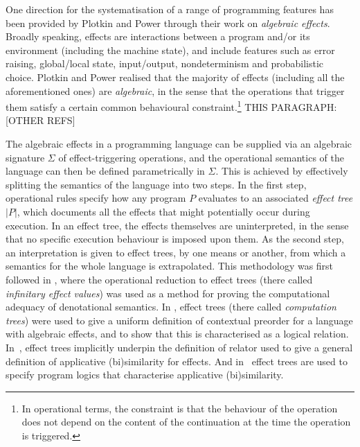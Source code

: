 One direction for the systematisation of a range of programming features has been provided by Plotkin and Power through their work on
 \emph{algebraic effects}. Broadly speaking, effects are interactions between a  program and/or its environment (including the machine state), and include features such as
 error raising, global/local state, input/output, nondeterminism and probabilistic choice. 
 Plotkin and Power realised that the majority of effects (including all the aforementioned ones) are \emph{algebraic}, in the sense that the operations that trigger them %
 satisfy a certain common behavioural constraint.\footnote{In operational terms, the constraint  is that the behaviour of the operation does not depend on the content of the continuation at the time the operation is triggered.} THIS PARAGRAPH: \cite{plotkin2001adequacy} [OTHER REFS]

The algebraic effects  in a programming language can  be supplied via an algebraic signature $\Sigma$ of effect-triggering operations,
and the operational semantics of the language can then be defined parametrically in $\Sigma$. 
This is achieved by effectively splitting the semantics of 
the language into two steps. In the first step, operational rules specify how any program $P$ evaluates 
to an associated \emph{effect tree} $|P|$, 
which documents  all the effects that might potentially occur during execution. %
In an effect tree, the effects themselves are uninterpreted, in the sense that no specific execution behaviour is imposed upon them. 
As the second step, an interpretation is given to effect trees, by one means or another, from which a semantics for the whole language is extrapolated.
This methodology was first followed in \cite{plotkin2001adequacy}, where the operational reduction to effect trees (there called \emph{infinitary effect values}) was used as a method for proving the computational adequacy of denotational semantics. 
In \cite{gom}, effect trees (there called \emph{computation trees}) were used to give a uniform definition of 
contextual preorder for a language with algebraic effects, and to show that this is characterised as a logical relation.
In~\cite{Ugo2017}, effect trees implicitly underpin the definition of relator used to give a general definition of applicative (bi)similarity for effects.
And in~\cite{SV2018,Voor2018} effect trees are used to specify program logics that characterise applicative (bi)similarity.

